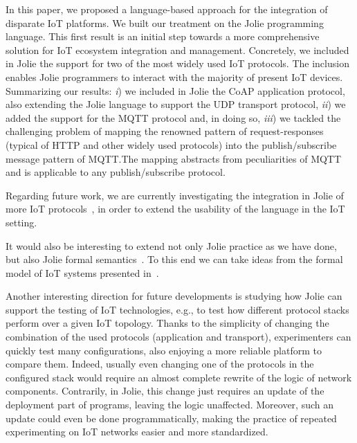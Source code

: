 In this paper, we proposed a language-based approach for the integration of
disparate IoT platforms. We built our treatment on the Jolie programming
language. This first result is an initial step towards a more comprehensive
solution for IoT ecosystem integration and management. Concretely, we included
in Jolie the support for two of the most widely used IoT protocols. The
inclusion enables Jolie programmers to interact with the majority of present IoT
devices. Summarizing our results: \emph{i}) we included in Jolie the CoAP
application protocol, also extending the Jolie language to support the UDP
transport protocol, \emph{ii}) we added the support for the MQTT protocol and,
in doing so, \emph{iii}) we tackled the challenging problem of mapping the
renowned pattern of request-responses (typical of HTTP and other widely used
protocols) into the publish/subscribe message pattern of MQTT.\@ The mapping
abstracts from peculiarities of MQTT and is applicable to any publish/subscribe
protocol.

Regarding future work, we are currently investigating the integration in Jolie
of more IoT protocols~\cite{7123563}, in order to extend the usability of the
language in the IoT setting.

It would also be interesting to extend not only Jolie practice as we
have done, but also Jolie formal semantics~\cite{Guidi2006}. To this
end we can take ideas from the formal model of IoT systems presented
in~\cite{LaneseBF13}.


Another interesting direction for future developments is studying how Jolie
can support the testing of IoT technologies, e.g., to test how
different protocol stacks perform over a given IoT topology. Thanks to the
simplicity of changing the combination of the used protocols (application and
transport), experimenters can quickly test many configurations, also enjoying
a more reliable platform to compare them. Indeed, usually even changing one
of the protocols in the configured stack would require an almost complete
rewrite of the logic of network components. Contrarily, in Jolie, this change
just requires an update of the deployment part of programs, leaving the logic
unaffected. Moreover, such an update could even be done programmatically,
making the practice of repeated experimenting on IoT networks easier and more
standardized.

